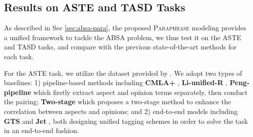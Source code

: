\documentclass[11pt]{article}
\begin{document}
\begin{table}[!t]
    \centering
    \caption{Results of the ASTE task compared with previous state-of-the-art models. F1 scores are reported.}
    \label{tab:aste}
\end{table}


\subsection{Results on ASTE and TASD Tasks}
As described in Sec \ref{sec:absa-para}, the proposed \textsc{Paraphrase} modeling provides a unified framework to tackle the ABSA problem, we thus test it on the ASTE and TASD tasks, and compare with the previous state-of-the-art methods for each task. 

For the ASTE task, we utilize the dataset provided by \citet{emnlp20-xulu}. We adopt two types of baselines: 1) pipeline-based methods including \textbf{CMLA+} \cite{aaai17-cmla}, \textbf{Li-unified-R} \cite{aaai19-lx-e2e-tbsa}, \textbf{Peng-pipeline} \cite{aaai20-robin} which firstly extract aspect and opinion terms separately, then conduct the pairing; \textbf{Two-stage} \cite{arxiv-two-stage-aste} which proposes a two-stage method to enhance the correlation between aspects and opinions; and 2) end-to-end models including \textbf{GTS} \cite{emnlp20-findings-gts} and \textbf{Jet} \cite{emnlp20-xulu}, both designing unified tagging schemes in order to solve the task in an end-to-end fashion.
\end{document}
